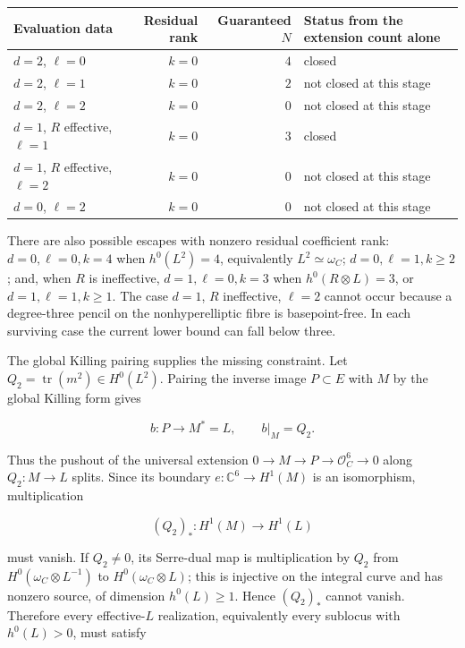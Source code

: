 \documentclass[11pt]{article}
\theoremstyle{definition}
\begin{document}
\begin{longtable}[]{@{}lrrl@{}}
\toprule\noalign{}
Evaluation data & Residual rank & Guaranteed \(N\) & Status from the
extension count alone \\
\midrule\noalign{}
\endhead
\bottomrule\noalign{}
\endlastfoot
\(d=2\), \(\ell=0\) & \(k=0\) & \(4\) & closed \\
\(d=2\), \(\ell=1\) & \(k=0\) & \(2\) & not closed at this stage \\
\(d=2\), \(\ell=2\) & \(k=0\) & \(0\) & not closed at this stage \\
\(d=1\), \(R\) effective, \(\ell=1\) & \(k=0\) & \(3\) & closed \\
\(d=1\), \(R\) effective, \(\ell=2\) & \(k=0\) & \(0\) & not closed at
this stage \\
\(d=0\), \(\ell=2\) & \(k=0\) & \(0\) & not closed at this stage \\
\end{longtable}

There are also possible escapes with nonzero residual coefficient rank:
\(d=0,\ell=0,k=4\) when \(h^0(L^2)=4\), equivalently
\(L^2\simeq\omega_C\); \(d=0,\ell=1,k\ge2\); and, when \(R\) is
ineffective, \(d=1,\ell=0,k=3\) when \(h^0(R\otimes L)=3\), or
\(d=1,\ell=1,k\ge1\). The case \(d=1\), \(R\) ineffective, \(\ell=2\)
cannot occur because a degree-three pencil on the nonhyperelliptic fibre
is basepoint-free. In each surviving case the current lower bound can
fall below three.

The global Killing pairing supplies the missing constraint. Let
\(Q_2=\operatorname{tr}(m^2)\in H^0(L^2)\). Pairing the inverse image
\(P\subset E\) with \(M\) by the global Killing form gives

\[b:P\longrightarrow M^*=L,
\qquad b|_M=Q_2.\]

Thus the pushout of the universal extension
\(0\to M\to P\to\mathcal O_C^6\to0\) along \(Q_2:M\to L\) splits. Since
its boundary \(e:\mathbb C^6\to H^1(M)\) is an isomorphism,
multiplication

\[(Q_2)_*:H^1(M)\longrightarrow H^1(L)\]

must vanish. If \(Q_2\ne0\), its Serre-dual map is multiplication by \(Q_2\)
from \(H^0(\omega_C\otimes L^{-1})\) to \(H^0(\omega_C\otimes L)\); this
is injective on the integral curve and has nonzero source, of dimension
\(h^0(L)\ge1\). Hence \((Q_2)_*\) cannot vanish. Therefore every
effective-\(L\) realization,
equivalently every sublocus with \(h^0(L)>0\), must satisfy
\end{document}
